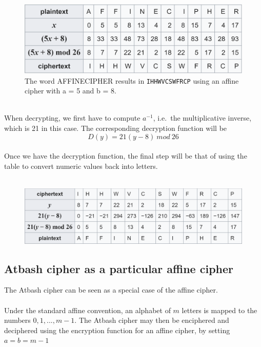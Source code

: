 \documentclass[Lau,binding=0.6cm,oneside]{sapthesis}
\begin{document}
\begin{figure}[H]
\includegraphics[scale=0.5]{affine_encrypt}
\captionsetup{justification=centering, margin=2cm}
\centering
\caption{The word \textsf{AFFINECIPHER} results in \texttt{IHHWVCSWFRCP} using an affine cipher with a = 5 and b = 8.}
\centering
\end{figure}
\ \\
When decrypting, we first have to compute $a^{-1}$, i.e.\ the multiplicative inverse, which is 21 in this case. The corresponding decryption function will be\\
\begin{equation}
D{(y)} = 21(y-8) \ mod \ 26
\end{equation}
\ \\
Once we have the decryption function, the final step will be that of using the table to convert numeric values back into letters.\\\\

\begin{figure}[H]
\includegraphics[scale=0.68]{affine_decrypt}
\centering
\caption{}
\centering
\end{figure}	

\subsection{Atbash cipher as a particular affine cipher}
The Atbash cipher can be seen as a special case of the affine cipher.\\\\
Under the standard affine convention, an alphabet of $m$ letters is mapped to the numbers $0,1, ..., m-1$. The Atbash cipher may then be enciphered and deciphered using the encryption function for an affine cipher, by setting $a=b=m-1$
\end{document}
